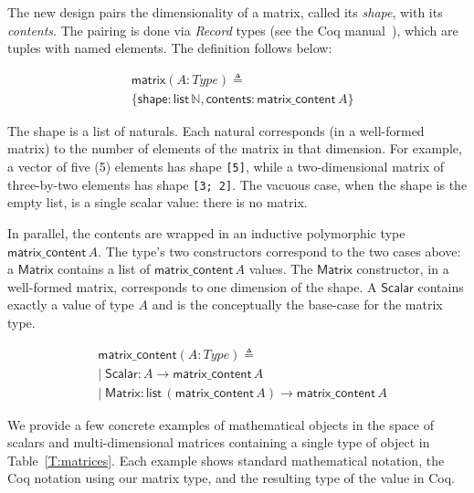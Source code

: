 \documentclass[11pt,conference]{IEEEtran}
\newcommand{\var}[1]{\mathit{#1}}
\newcommand{\func}[1]{\mathsf{#1}}
\theoremstyle{plain} %
\theoremstyle{definition}
\theoremstyle{remark}
\begin{document}
The new design pairs the dimensionality of a matrix, called its \emph{shape},
with its \emph{contents}. The pairing is done via \emph{Record} types (see the
Coq manual~\cite{Coq}), which are tuples with named elements. The definition
follows below:

\begin{align*}
    & \func{matrix} (\var{A}: \var{Type}) \triangleq \\
    & \{
        \func{shape}: \func{list}\, \mathbb{N},
        \func{contents}: \func{matrix\_content}\, \var{A}
    \}
\end{align*}

The shape is a list of naturals. Each natural corresponds (in a well-formed
matrix) to the number of elements of the matrix in that dimension. For example,
a vector of five (5) elements has shape \texttt{[5]}, while a two-dimensional
matrix of three-by-two elements has shape \texttt{[3; 2]}. The vacuous case,
when the shape is the empty list, is a single scalar value: there is no matrix.

In parallel, the contents are wrapped in an inductive polymorphic type
\(\func{matrix\_content}\, \var{A}\). The type's two constructors correspond to
the two cases above: a \(\func{Matrix}\) contains a list of
\(\func{matrix\_content}\, \var{A}\) values. The \(\func{Matrix}\) constructor,
in a well-formed matrix, corresponds to one dimension of the shape. A
\(\func{Scalar}\) contains exactly a value of type \(\var{A}\) and is the
conceptually the base-case for the matrix type.

\begin{align*}
    & \func{matrix\_content} (\var{A}: \var{Type}) \triangleq\; \\
    & |\; \func{Scalar}: \var{A} \to \func{matrix\_content}\, \var{A} \\
    & |\; \func{Matrix}: \func{list}\, (\func{matrix\_content}\, \var{A}) \to \func{matrix\_content}\, \var{A}
\end{align*}

We provide a few concrete examples of mathematical objects in the space of
scalars and multi-dimensional matrices containing a single type of object in
Table~\ref{T:matrices}. Each example shows standard mathematical notation, the
Coq notation using our matrix type, and the resulting type of the value in Coq.
\end{document}
